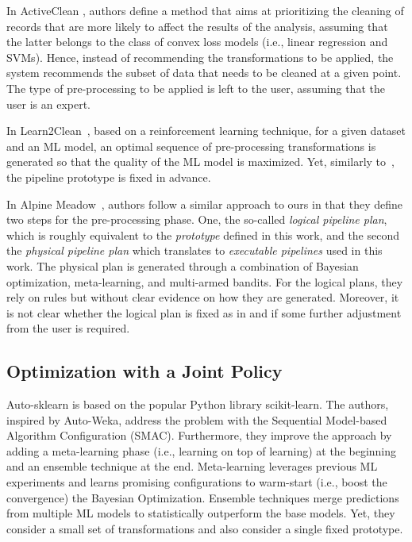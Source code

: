 In ActiveClean \cite{ActiveClean16PVLDB}, authors define a method that aims at prioritizing the cleaning of records that are more likely to affect the results of the analysis, assuming that the latter belongs to the class of convex loss models (i.e., linear regression and SVMs).
Hence, instead of recommending the transformations to be applied, the system recommends the subset of data that needs to be cleaned at a given point.
The type of pre-processing to be applied is left to the user, assuming that the user is an expert.

In Learn2Clean~\cite{Berti19WWW}, based on a reinforcement learning technique, for a given dataset and an ML model, an optimal sequence of pre-processing transformations is generated so that the quality of the ML model is maximized.
Yet, similarly to~\cite{Quemy20InfSystems}, the pipeline prototype is fixed in advance.

In Alpine Meadow~\cite{Shang19SIGMOD}, authors follow a similar approach to ours in that they define two steps for the pre-processing phase. One, the so-called \textit{logical pipeline plan}, which is roughly equivalent to the \textit{prototype} defined in this work, and the second the \textit{physical pipeline plan} which translates to \textit{executable pipelines} used in this work.
The physical plan is generated through a combination of Bayesian optimization, meta-learning, and multi-armed bandits.
For the logical plans, they rely on rules but without clear evidence on how they are generated.
Moreover, it is not clear whether the logical plan is fixed as in \cite{Quemy20InfSystems} and if some further adjustment from the user is required.

\subsection{Optimization with a Joint Policy}
\label{effective-ssec:dpso-cash}
Auto-sklearn \cite{Feurer15AutoSklearn} is based on the popular Python library scikit-learn.
The authors, inspired by Auto-Weka, address the problem with the Sequential Model-based Algorithm Configuration (SMAC).
Furthermore, they improve the approach by adding a meta-learning phase (i.e., learning on top of learning) at the beginning and an ensemble technique at the end.
Meta-learning leverages previous ML experiments and learns promising configurations to warm-start (i.e., boost the convergence) the Bayesian Optimization.
Ensemble techniques merge predictions from multiple ML models to statistically outperform the base models.
Yet, they consider a small set of transformations and also consider a single fixed prototype.

